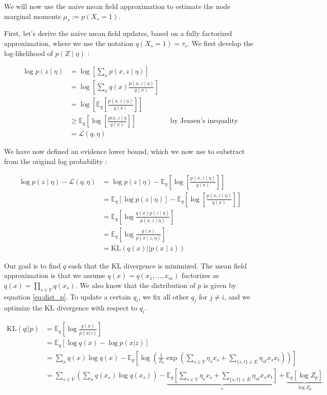 \documentclass[11pt]{article}
\newcommand{\Expect}[2][]{\mathbb{E}_{#1}\!\left[#2 \right]}
\newcommand{\KL}[1]{\mathrm{KL}\left( #1 \right)}
\begin{document}
\begin{description}
We will now use the naive mean field approximation to estimate the node marginal moments ${\mu_s := p(X_s = 1)}$.

First, let's derive the naive mean field updates, based on a fully factorized approximation, where we use the notation $q(X_s=1) = \tau_s$. We first develop the log-likelihood of $p(Z\mid \eta)$ :

\begin{align*}
\log p(z\mid \eta) & = \log \left[ \sum_x p(x,z \mid \eta) \right]\\
				   & = \log \left[\sum_x q(x) \frac{p(x,z \mid \eta)}{q(x)}\right] \\
				   & = \log \left[ \Expect[q]{\frac{p(x,z \mid \eta)}{q(x)}} \right] \\
				   & \geq \Expect[q]{\log \left[ \frac{p(x,z \mid \eta}{q(x)} \right]} && \text{by Jensen's inequality} \\
				   & = \mathcal{L}(q,\eta)
\end{align*}

We have now defined an evidence lower bound, which we now use to substract from the original log probability :

\begin{align*}
\log p(z \mid \eta) - \mathcal{L}(q,\eta) & = \log p(z \mid \eta) - \Expect[q]{\log \left[ \frac{p(x,z \mid \eta)}{q(x)} \right]} \\
										  & = \Expect[q]{\log p(z\mid \eta)} - \Expect[q]{\log \left[\frac{p(x,z \mid \eta)}{q(x)}\right]} \\
										  & = \Expect[q]{\log \frac{q(x)p(z\mid \eta)}{p(x,z\mid \eta)}} \\ 
										  & = \Expect[q]{\log \frac{q(x)}{p(x\mid z,\eta)}} \\
										  & = \KL{q(x) || p(x\mid z)}							  
\end{align*}

Our goal is to find $q$ such that the KL divergence is minimized. The mean field approximation is that we assume $q(x) = q(x_1,\dots,x_m)$ factorizes as $q(x) = \prod_{s \in V} q(x_s)$. We also know that the distribution of $p$ is given by equation \ref{eq:dist_p}. To update a certain $q_i$, we fix all other $q_j$ for $j \neq i$, and we optimize the KL divergence with respect to $q_i$.

\begin{align}\label{eq:partial_kl}
\KL{q||p} & = \Expect[q]{\log \frac{q(x)}{p(x|z)}} \nonumber\\
		  & = \Expect[q]{\log q(x) - \log p(x|z)} \nonumber\\
		  & = \sum_x q(x)\log q(x) - \Expect[q]{\log \left(\frac{1}{Z_p} \exp \left( \sum_{s \in V} \eta_s x_s + \sum_{\{s,t\} \in E} \eta_{st} x_s x_t \right) \right)} \nonumber\\
		  & = \sum_{s \in V} \left( \sum_{x} q(x_s)\log q(x_s) \right) - \underbrace{\Expect[q]{\sum_{s \in V} \eta_s x_s + \sum_{\{s,t\} \in E} \eta_{st} x_s x_t}}_{*} + \underbrace{\Expect[q]{\log Z_p}}_{\log Z_p}
\end{align}


\end{description}
\end{document}
